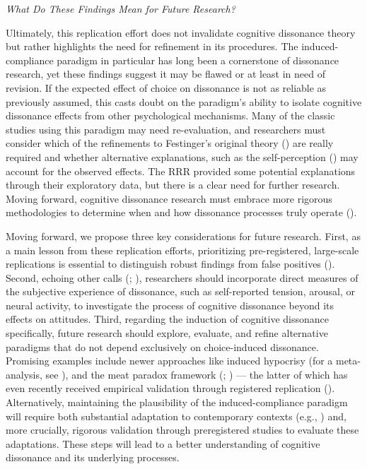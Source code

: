 \documentclass[
  letterpaper,
]{book}
\begin{document}
\emph{What Do These Findings Mean for Future Research?}

Ultimately, this replication effort does not invalidate cognitive
dissonance theory but rather highlights the need for refinement in its
procedures. The induced-compliance paradigm in particular has long been
a cornerstone of dissonance research, yet these findings suggest it may
be flawed or at least in need of revision. If the expected effect of
choice on dissonance is not as reliable as previously assumed, this
casts doubt on the paradigm's ability to isolate cognitive dissonance
effects from other psychological mechanisms. Many of the classic studies
using this paradigm may need re-evaluation, and researchers must
consider which of the refinements to Festinger's original theory
() are really required and
whether alternative explanations, such as the self-perception
() may account for the
observed effects. The RRR provided some potential explanations through
their exploratory data, but there is a clear need for further research.
Moving forward, cognitive dissonance research must embrace more rigorous
methodologies to determine when and how dissonance processes truly
operate ().

Moving forward, we propose three key considerations for future research.
First, as a main lesson from these replication efforts, prioritizing
pre-registered, large-scale replications is essential to distinguish
robust findings from false positives
(). Second, echoing other calls
(;
),
researchers should incorporate direct measures of the subjective
experience of dissonance, such as self-reported tension, arousal, or
neural activity, to investigate the process of cognitive dissonance
beyond its effects on attitudes. Third, regarding the induction of
cognitive dissonance specifically, future research should explore,
evaluate, and refine alternative paradigms that do not depend
exclusively on choice-induced dissonance. Promising examples include
newer approaches like induced hypocrisy (for a meta-analysis, see
), and the meat
paradox framework (; ) --- the latter of which has even recently received empirical
validation through registered replication
().
Alternatively, maintaining the plausibility of the induced-compliance
paradigm will require both substantial adaptation to contemporary
contexts (e.g., )
and, more crucially, rigorous validation through preregistered studies
to evaluate these adaptations. These steps will lead to a better
understanding of cognitive dissonance and its underlying processes.
\end{document}
